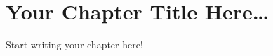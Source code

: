 \documentclass[../book]{subfiles}
\begin{document}
\chapter{Your Chapter Title Here…}

Start writing your chapter here!
\end{document}
